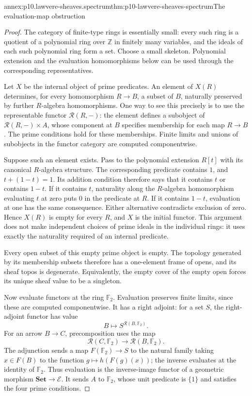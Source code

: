 \begin{annexitem}{annex:p10.lawvere-sheaves.spectrum}{thm:p10-lawvere-sheaves-spectrum}{The evaluation-map obstruction}
\begin{proof}
The category of finite-type rings is essentially small: every such
ring is a quotient of a polynomial ring over \(\mathbb Z\) in
finitely many variables, and the ideals of each such polynomial
ring form a set. Choose a small skeleton. Polynomial extension
and the evaluation homomorphisms below can be used through the
corresponding representatives.

Let \(X\) be the internal object of prime predicates.
An element of \(X(R)\) determines, for every homomorphism
\(R\to B\), a subset of \(B\), naturally preserved by further
\(R\)-algebra homomorphisms. One way to see this precisely is to
use the representable functor \(\mathcal R(R,-)\): the element
defines a subobject of
\(\mathcal R(R,-)\times A\), whose component at \(B\) specifies
membership for each map \(R\to B\).
The prime conditions hold for these memberships. Finite limits
and unions of subobjects in the functor category are computed
componentwise.

Suppose such an element exists. Pass to the polynomial extension
\(R[t]\) with its canonical \(R\)-algebra structure.
The corresponding predicate contains \(1\), and
\(t+(1-t)=1\). Its addition condition therefore says that it
contains \(t\) or contains \(1-t\).
If it contains \(t\), naturality along the \(R\)-algebra
homomorphism evaluating \(t\) at zero puts \(0\) in the
predicate at \(R\). If it contains \(1-t\), evaluation at one
has the same consequence. Either alternative contradicts
exclusion of zero. Hence \(X(R)\) is empty for every \(R\),
and \(X\) is the initial functor. This argument does not make
independent choices of prime ideals in the individual rings:
it uses exactly the naturality required of an internal predicate.

Every open subset of this empty prime object is empty.
The topology generated by its membership subsets therefore
has a one-element frame of opens, and its sheaf topos is
degenerate. Equivalently, the empty cover of the empty open
forces its unique sheaf value to be a singleton.

Now evaluate functors at the ring \(\mathbb F_2\).
Evaluation preserves finite limits, since these are computed
componentwise. It has a right adjoint: for a set \(S\), the
right-adjoint functor has value
\[
 B\longmapsto S^{\mathcal R(B,\mathbb F_2)}.
\]
For an arrow \(B\to C\), precomposition uses the map
\[
 \mathcal R(C,\mathbb F_2)\longrightarrow
 \mathcal R(B,\mathbb F_2).
\]
The adjunction sends a map \(F(\mathbb F_2)\to S\) to the
natural family taking \(x\in F(B)\) to the function
\(g\mapsto h(F(g)(x))\); the inverse evaluates at the identity
of \(\mathbb F_2\).
Thus evaluation is the inverse-image functor of a geometric
morphism \(\mathbf{Set}\to\mathcal E\).
It sends \(A\) to \(\mathbb F_2\), whose unit predicate is
\(\{1\}\) and satisfies the four prime conditions.


\end{proof}
\end{annexitem}
